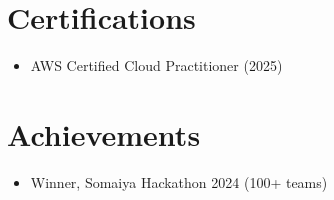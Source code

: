 \documentclass[letterpaper,11pt]{article}
\newcommand{\resumeItem}[1]{\item\small{#1}}
\begin{document}
\section{Certifications}
 \begin{itemize}[leftmargin=0.25in, itemsep=0pt, topsep=2pt]
    \resumeItem{AWS Certified Cloud Practitioner (2025)}
 \end{itemize}
\vspace{-6pt}

\section{Achievements}
 \begin{itemize}[leftmargin=0.25in, itemsep=0pt, topsep=2pt]
    \resumeItem{Winner, Somaiya Hackathon 2024 (100+ teams)}
 \end{itemize}
\end{document}
